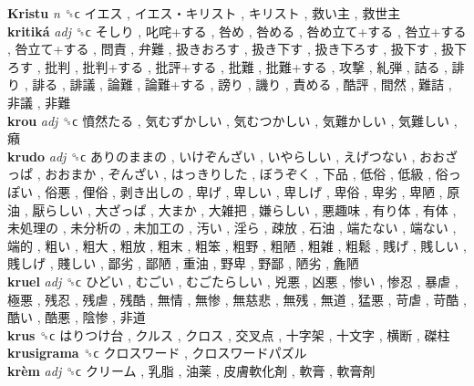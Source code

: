 \textbf{Kristu} \emph{n}  ␝ϲ   イエス ,  イエス・キリスト ,  キリスト ,  救い主 ,  救世主   \\
\textbf{kritiká} \emph{adj}  ␝ϲ   そしり ,  叱咤+する ,  咎め ,  咎める ,  咎め立て+する ,  咎立+する ,  咎立て+する ,  問責 ,  弁難 ,  扱きおろす ,  扱き下す ,  扱き下ろす ,  扱下す ,  扱下ろす ,  批判 ,  批判+する ,  批評+する ,  批難 ,  批難+する ,  攻撃 ,  糺弾 ,  詰る ,  誹り ,  誹る ,  誹議 ,  論難 ,  論難+する ,  謗り ,  譏り ,  責める ,  酷評 ,  間然 ,  難詰 ,  非議 ,  非難   \\
\textbf{krou} \emph{adj}  ␝ϲ   憤然たる ,  気むずかしい ,  気むつかしい ,  気難かしい ,  気難しい ,  癪   \\
\textbf{krudo} \emph{adj}  ␝ϲ   ありのままの ,  いけぞんざい ,  いやらしい ,  えげつない ,  おおざっぱ ,  おおまか ,  ぞんざい ,  はっきりした ,  ぼうぞく ,  下品 ,  低俗 ,  低級 ,  俗っぽい ,  俗悪 ,  俚俗 ,  剥き出しの ,  卑げ ,  卑しい ,  卑しげ ,  卑俗 ,  卑劣 ,  卑陋 ,  原油 ,  厭らしい ,  大ざっぱ ,  大まか ,  大雑把 ,  嫌らしい ,  悪趣味 ,  有り体 ,  有体 ,  未処理の ,  未分析の ,  未加工の ,  汚い ,  淫ら ,  疎放 ,  石油 ,  端たない ,  端ない ,  端的 ,  粗い ,  粗大 ,  粗放 ,  粗末 ,  粗笨 ,  粗野 ,  粗陋 ,  粗雑 ,  粗鬆 ,  賎げ ,  賎しい ,  賎しげ ,  賤しい ,  鄙劣 ,  鄙陋 ,  重油 ,  野卑 ,  野鄙 ,  陋劣 ,  麁陋   \\
\textbf{kruel} \emph{adj}  ␝ϲ   ひどい ,  むごい ,  むごたらしい ,  兇悪 ,  凶悪 ,  惨い ,  惨忍 ,  暴虐 ,  極悪 ,  残忍 ,  残虐 ,  残酷 ,  無情 ,  無惨 ,  無慈悲 ,  無残 ,  無道 ,  猛悪 ,  苛虐 ,  苛酷 ,  酷い ,  酷悪 ,  陰惨 ,  非道   \\
\textbf{krus} ␝ϲ   はりつけ台 ,  クルス ,  クロス ,  交叉点 ,  十字架 ,  十文字 ,  横断 ,  磔柱   \\
\textbf{krusigrama} ␝ϲ   クロスワード ,  クロスワードパズル   \\
\textbf{krèm} \emph{adj}  ␝ϲ   クリーム ,  乳脂 ,  油薬 ,  皮膚軟化剤 ,  軟膏 ,  軟膏剤   \\
